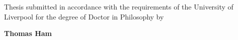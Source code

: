 \begin{center}
\begin{minipage}{1\linewidth}
		\vspace{2cm}
		{\large Thesis submitted in accordance with the requirements of the University of Liverpool for the degree of Doctor in Philosophy by} \par
		\vspace{1cm}
		\Large \textbf{Thomas Ham} \par
		\vspace{1cm}
		\vspace{1cm}
		{\Large \monthyeardate}
	\end{minipage}
\end{center}
\vfill
\clearpage